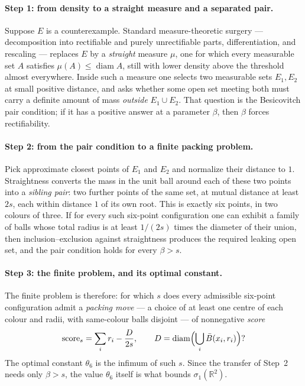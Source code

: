 \documentclass[11pt]{article}
\theoremstyle{plain}
\theoremstyle{definition}
\theoremstyle{remark}
\newcommand{\R}{\mathbb R}
\newcommand{\score}{\operatorname{score}}
\newcommand{\diam}{\operatorname{diam}}
\begin{document}
\paragraph{Step 1: from density to a straight measure and a separated
pair.}
Suppose $E$ is a counterexample.  Standard measure-theoretic surgery ---
decomposition into rectifiable and purely unrectifiable parts,
differentiation, and rescaling --- replaces $E$ by a \emph{straight}
measure $\mu$, one for which every measurable set $A$ satisfies
$\mu(A)\le\diam A$, still with lower density above the threshold almost
everywhere.  Inside such a measure one selects two measurable sets
$E_1,E_2$ at small positive distance, and asks whether some open set
meeting both must carry a definite amount of mass \emph{outside}
$E_1\cup E_2$.  That question is the Besicovitch pair condition; if it has
a positive answer at a parameter $\beta$, then $\beta$ forces
rectifiability.

\paragraph{Step 2: from the pair condition to a finite packing problem.}
Pick approximate closest points of $E_1$ and $E_2$ and normalize their
distance to $1$.  Straightness converts the mass in the unit ball around
each of these two points into a \emph{sibling pair}: two further points of
the same set, at mutual distance at least $2s$, each within distance $1$ of
its own root.  This is exactly six points, in two colours of three.  If for
every such six-point configuration one can exhibit a family of balls whose
total radius is at least $1/(2s)$ times the diameter of their union, then
inclusion--exclusion against straightness produces the required leaking open
set, and the pair condition holds for every $\beta>s$.

\paragraph{Step 3: the finite problem, and its optimal constant.}
The finite problem is therefore: for which $s$ does every admissible
six-point configuration admit a \emph{packing move} --- a choice of at least
one centre of each colour and radii, with same-colour balls disjoint --- of
nonnegative \emph{score}
\[
 \score_s=\sum_i r_i-\frac{D}{2s},\qquad D=\diam\Bigl(\bigcup_i \bar B(x_i,r_i)\Bigr)?
\]
The optimal constant $\theta_6$ is the infimum of such $s$.  Since the
transfer of Step~2 needs only $\beta>s$, the value $\theta_6$ itself is
what bounds $\sigma_1(\R^2)$.
\end{document}
